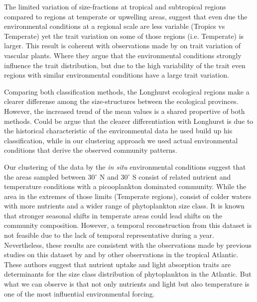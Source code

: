 The limited variation of size-fractions at tropical and subtropical regions compared to regions at temperate or upwelling areas, suggest that even due the environmental conditions at a regional scale are less variable (Tropics vs Temperate) yet the trait variation on some of those regions  (i.e. Temperate) is larger. This result is coherent with observations made by \citet{Messier2010} on trait variation of vascular plants. Where they argue that the environmental conditions strongly influence the trait distribution, but due to the high variability of the trait even regions with similar environmental conditions have a large trait variation. 

Comparing both classification methods, the Longhurst ecological regions make a clearer differense among the size-structures between the ecological provinces. However, the increased trend of the mean values is a shared propertive of both methods. Could be argue that the clearer differentiation with Longhurst is due to the historical characteristic of the environmental data he used build up his classification, while in our clustering approach we used actual environmental conditions that derive the observed community patterns.

Our clustering of the data by the \textit{in situ} environmental conditions suggest that the areas sampled between 30$^\circ$ N and 30$^\circ$ S consist of related nutrient and temperature conditions with a picooplankton dominated community. While the area in the extremes of those limits (Temperate regions), consist of colder waters with more nutrients and a wider range of phytoplankton size class. It is known that stronger seasonal shifts in temperate areas could lead shifts on the community composition. However, a temporal reconstruction from this dataset is not feasible due to the lack of temporal representative during a year. Nevertheless, these results are consistent with the observations made by previous studies on this dataset by \citep{Maranon2000, Maranon2001, Poulton2006} and by other observations in the tropical Atlantic\citep{Moreno-Ostos2011}. These authors suggest that nutrient uptake and light absorption traits are determinants for the size class distribution of phytoplankton in the Atlantic. But what we can observe is that not only nutrients and light but also temperature is one of the most influential environmental forcing. 

